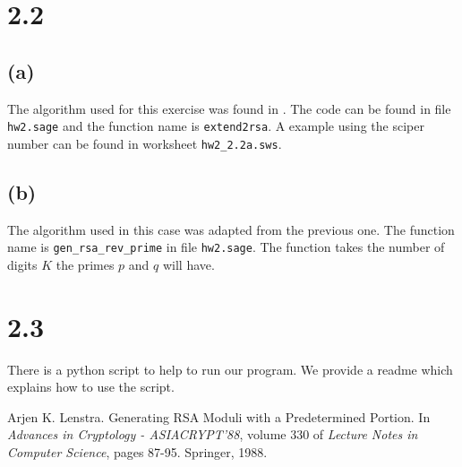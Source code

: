 \documentclass[12pt,a4paper]{article}
\begin{document}
\section*{2.2}
\subsection*{(a)}
The algorithm used for this exercise was found in \cite{lenstra}.
The code can be found in file \texttt{hw2.sage} and the function name is \texttt{extend2rsa}.
A example using the sciper number can be found in worksheet \texttt{hw2\_2.2a.sws}.

\subsection*{(b)}
The algorithm used in this case was adapted from the previous one. The function name is \texttt{gen\_rsa\_rev\_prime} in file \texttt{hw2.sage}.
The function takes the number of digits $K$ the primes $p$ and $q$ will have.

\section*{2.3}
There is a python script to help to run our program.
We provide a readme which explains how to use the script.

\begin{thebibliography}{1}
    Arjen K. Lenstra. Generating RSA Moduli with a Predetermined Portion.
    In \emph{Advances in Cryptology - ASIACRYPT'88}, volume 330 of \emph{Lecture Notes in Computer Science}, pages 87-95. Springer, 1988. 
\end{thebibliography}
\end{document}
